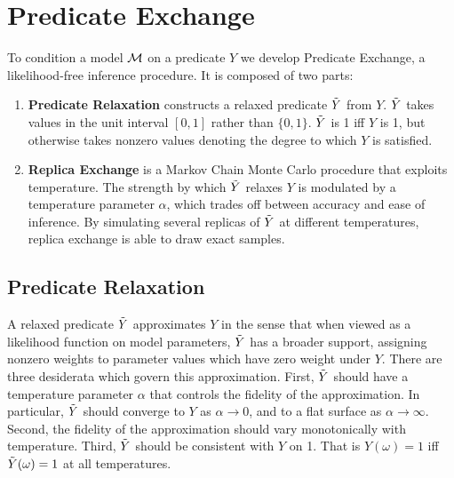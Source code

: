 \section{Predicate Exchange}
To condition a model ${\mathcal{M}}$ on a predicate $Y$ we develop Predicate Exchange, a likelihood-free inference procedure.  It is composed of two parts:
\begin{enumerate}
\item \textbf{Predicate Relaxation} constructs a relaxed predicate $\tilde{Y}$ from $Y$. $\tilde{Y}$ takes values in the unit interval $[0, 1]$ rather than $\{0, 1\}$.
$\tilde{Y}$ is 1 iff $Y$ is 1, but otherwise takes nonzero values denoting the degree to which $Y$ is satisfied.
\item  \textbf{Replica Exchange} is a Markov Chain Monte Carlo procedure that exploits temperature. The strength by which $\tilde{Y}$ relaxes $Y$ is modulated by a temperature parameter $\alpha$, which trades off between accuracy and ease of inference.  By simulating several replicas of $\tilde{Y}$ at different temperatures, replica exchange is able to draw exact samples. 
\end{enumerate}

\subsection{Predicate Relaxation}\label{predexchange}

A relaxed predicate $\tilde{Y}$ approximates $Y$ in the sense that when viewed as a likelihood function on model parameters, $\tilde{Y}$ has a broader support, assigning nonzero weights to parameter values which have zero weight under $Y$.
There are three desiderata which govern this approximation.
First, $\tilde{Y}$ should have a temperature parameter $\alpha$ that controls the fidelity of the approximation. In particular, $\tilde{Y}$ should converge to $Y$ as $\alpha \to 0$, and to a flat surface as $\alpha \to \infty$. Second, the fidelity of the approximation should vary monotonically with temperature. Third, $\tilde{Y}$ should be consistent with $Y$ on 1. That is $Y(\omega) = 1$ iff $\tilde{Y}(\omega) = 1$ at all temperatures.  



